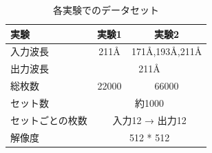 \begin{table}[h]
    \centering
    \begin{tabular}{l|c|c}
    \hline
    実験 & 実験1 & 実験2 \\
    \hline\hline
    入力波長 & 211Å & 171Å,193Å,211Å \\
    \hline
    出力波長 & \multicolumn{2}{c}{211Å} \\
    \hline
    総枚数 & 22000 & 66000 \\
    \hline
    セット数 & \multicolumn{2}{c}{約1000} \\
    \hline
    セットごとの枚数 & \multicolumn{2}{c}{入力12 → 出力12} \\
    \hline
    解像度 & \multicolumn{2}{c}{512 * 512} \\
    \hline
    \end{tabular}
    \caption{各実験でのデータセット}
    \label{tab:dataset}
\end{table}
